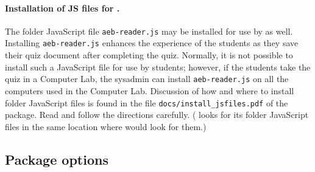 \documentclass{article}
\def\FmtMP#1{\marginpar{\small\itshape\raggedleft#1}}
\begin{document}
\paragraph*{Installation of JS files for .} The folder JavaScript
file \texttt{aeb-reader.js} may be installed for use by  as
well. Installing \texttt{aeb-reader.js} enhances the experience of the
students as they save their quiz document after completing the quiz.
Normally, it is not possible to install such a JavaScript file for use by
students; however, if the students take the quiz in a Computer Lab, the
sysadmin\FmtMP{sysadmin} can install \texttt{aeb-reader.js} on all the computers used in the
Computer Lab.  Discussion of how and where to install folder JavaScript files
is found in the file \texttt{docs/install\_jsfiles.pdf} of the
 package. Read and follow the directions carefully.
( looks for its folder JavaScript files in the same location
where  would look for them.)


\subsection{Package options}
\end{document}
